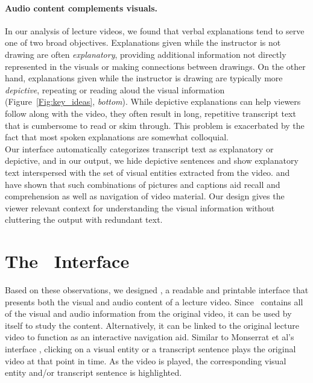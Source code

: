 \paragraph{Audio content complements visuals.}
In our analysis of lecture videos, we found that verbal explanations tend to serve one of two broad objectives. Explanations given while the instructor is not drawing are often \emph{explanatory}, providing additional information not directly represented in the visuals or making connections between drawings. On the other hand, explanations given while the instructor is drawing are typically more \emph{depictive}, repeating or reading aloud the visual information (Figure~\ref{Fig:key_ideas}, \textit{bottom}).
%
While depictive explanations can help viewers follow along with the video, they often result in long, repetitive transcript text that is cumbersome to read or skim through. This problem is exacerbated by the fact that most spoken explanations are somewhat colloquial.\\
%
Our interface automatically categorizes transcript text as explanatory or depictive, and in our output, we hide depictive sentences and show explanatory text interspersed with the set of visual entities extracted from the video. 
\cite{large1995multimedia} and \cite{christel2001effect} have shown that such combinations of pictures and captions aid recall and comprehension as well as navigation of video material.
%
Our design gives the viewer relevant context for understanding the visual information without cluttering the output with redundant text. 

\section{The \systemname\ Interface}
Based on these observations, we designed \textbf{\systemname}, a readable and printable interface that presents both the visual and audio content of a lecture video. Since \systemname\ contains all of the visual and audio information from the original video, it can be used by itself to study the content. Alternatively, it can be linked to the original lecture video to function as an interactive navigation aid. Similar to Monserrat et al's interface \cite{monserrat2013notevideo}, clicking on a visual entity or a transcript sentence plays the original video at that point in time. As the video is played, the corresponding visual entity and/or transcript sentence is highlighted. \\

